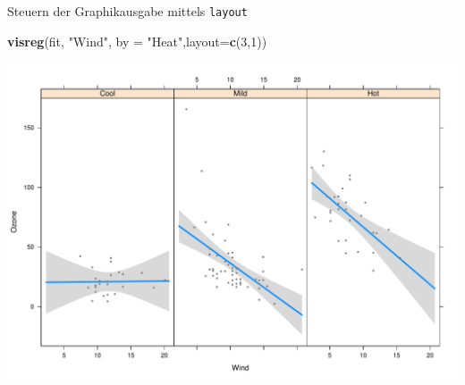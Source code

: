 \documentclass[ignorenonframetext,]{beamer}
\newenvironment{Shaded}{}{}
\newcommand{\KeywordTok}[1]{\textcolor[rgb]{0.00,0.44,0.13}{\textbf{{#1}}}}
\newcommand{\DataTypeTok}[1]{\textcolor[rgb]{0.56,0.13,0.00}{{#1}}}
\newcommand{\DecValTok}[1]{\textcolor[rgb]{0.25,0.63,0.44}{{#1}}}
\newcommand{\StringTok}[1]{\textcolor[rgb]{0.25,0.44,0.63}{{#1}}}
\newcommand{\NormalTok}[1]{{#1}}
\begin{document}
\begin{frame}[fragile]{Steuern der Graphikausgabe mittels
\texttt{layout}}

\begin{Shaded}
\begin{Highlighting}[]
\KeywordTok{visreg}\NormalTok{(fit, }\StringTok{"Wind"}\NormalTok{, }\DataTypeTok{by =} \StringTok{"Heat"}\NormalTok{,}\DataTypeTok{layout=}\KeywordTok{c}\NormalTok{(}\DecValTok{3}\NormalTok{,}\DecValTok{1}\NormalTok{))}
\end{Highlighting}
\end{Shaded}

\includegraphics{R_intern_files/figure-beamer/unnamed-chunk-316-1.pdf}

\end{frame}
\end{document}
